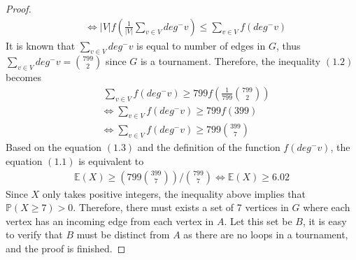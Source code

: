 \begin{proof}
\begin{align*}
    &\Leftrightarrow |V| f(\frac{1}{|V|} \sum_{v \in V} deg^{-}v) \leq \sum_{v \in V} f(deg^{-}v) \tag{1.2}
  \end{align*}
  It is known that $\sum_{v \in V} deg^{-}v$ is equal to number of edges in $G$, thus $\sum_{v \in V} deg^{-}v = \binom{799}{2}$ since $G$ is a tournament. Therefore, the inequality $(1.2)$ becomes
  \begin{align*}
    &\ \sum_{v \in V} f(deg^{-}v) \geq 799 f \left(\frac{1}{799} \binom{799}{2} \right) \\
    &\Leftrightarrow \sum_{v \in V} f(deg^{-}v) \geq 799 f(399) \\
    &\Leftrightarrow \sum_{v \in V} f(deg^{-}v) \geq 799 \binom{399}{7} \tag{1.3}
  \end{align*}
  Based on the equation $(1.3)$ and the definition of the function $f(deg^{-}v)$, the equation $(1.1)$ is equivalent to
  \begin{align*}
    \mathbb{E}(X) \geq \left(799 \binom{399}{7} \right) / \binom{799}{7} \Leftrightarrow \mathbb{E}(X) \geq 6.02
  \end{align*}
  Since $X$ only takes positive integers, the inequality above implies that $\mathbb{P}(X \geq 7) > 0$. Therefore, there must exists a set of 7 vertices in $G$ where each vertex has an incoming edge from each vertex in $A$. Let this set be $B$, it is easy to verify that $B$ must be distinct from $A$ as there are no loops in a tournament, and the proof is finished.
\end{proof}

